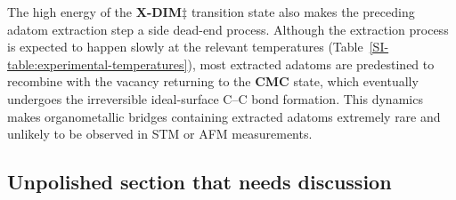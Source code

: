 \documentclass[aps,prb,reprint,amsmath,amssymb]{revtex4-1}
\newcommand{\lock}{\color{red}}
\newcommand{\lock}{\color{black}}
\begin{document}
{\lock

The high energy of the \textbf{X-DIM$\ddagger$} transition state also makes the preceding adatom extraction step a side dead-end process. Although the extraction process is expected to happen slowly at the relevant temperatures (Table~\ref{SI-table:experimental-temperatures}), most extracted adatoms are predestined to recombine with the vacancy returning to the \textbf{CMC} state, which eventually undergoes the irreversible ideal-surface C--C bond formation. 
%
%
This dynamics makes organometallic bridges containing extracted adatoms extremely rare and unlikely to be observed in STM or AFM measurements.

}

\ifdefined\INTERNAL
\subsection{Unpolished section that needs discussion}
\end{document}
